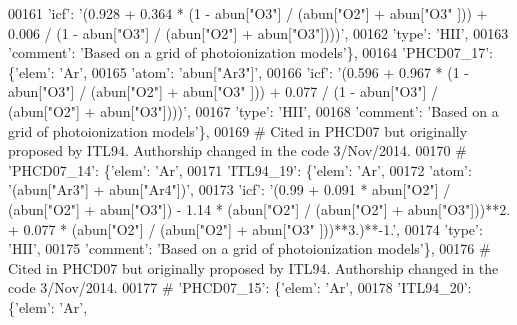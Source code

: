 \begin{DoxyCode}
00161                                        \textcolor{stringliteral}{'icf'}: \textcolor{stringliteral}{'(0.928 + 0.364 * (1 - abun["O3"] / (abun["O2"] + abun["O3"
      ])) + 0.006 / (1 - abun["O3"] / (abun["O2"] + abun["O3"])))'},
00162                                        \textcolor{stringliteral}{'type'}: \textcolor{stringliteral}{'HII'},
00163                                        \textcolor{stringliteral}{'comment'}: \textcolor{stringliteral}{'Based on a grid of photoionization models'}\},
00164                          \textcolor{stringliteral}{'PHCD07\_17'}: \{\textcolor{stringliteral}{'elem'}: \textcolor{stringliteral}{'Ar'},
00165                                        \textcolor{stringliteral}{'atom'}: \textcolor{stringliteral}{'abun["Ar3"]'},
00166                                        \textcolor{stringliteral}{'icf'}: \textcolor{stringliteral}{'(0.596 + 0.967 * (1 - abun["O3"] / (abun["O2"] + abun["O3"
      ])) + 0.077 / (1 - abun["O3"] / (abun["O2"] + abun["O3"])))'},
00167                                        \textcolor{stringliteral}{'type'}: \textcolor{stringliteral}{'HII'},
00168                                        \textcolor{stringliteral}{'comment'}: \textcolor{stringliteral}{'Based on a grid of photoionization models'}\},
00169 \textcolor{comment}{# Cited in PHCD07 but originally proposed by ITL94. Authorship changed in the code 3/Nov/2014. }
00170 \textcolor{comment}{#                         'PHCD07\_14': \{'elem': 'Ar',}
00171                          \textcolor{stringliteral}{'ITL94\_19'}: \{\textcolor{stringliteral}{'elem'}: \textcolor{stringliteral}{'Ar'},
00172                                        \textcolor{stringliteral}{'atom'}: \textcolor{stringliteral}{'(abun["Ar3"] + abun["Ar4"])'},
00173                                        \textcolor{stringliteral}{'icf'}: \textcolor{stringliteral}{'(0.99 + 0.091 * abun["O2"] / (abun["O2"] + abun["O3"]) -
       1.14 * (abun["O2"] / (abun["O2"] + abun["O3"]))**2. + 0.077 * (abun["O2"] / (abun["O2"] + abun["O3"
      ]))**3.)**-1.'},
00174                                        \textcolor{stringliteral}{'type'}: \textcolor{stringliteral}{'HII'},
00175                                        \textcolor{stringliteral}{'comment'}: \textcolor{stringliteral}{'Based on a grid of photoionization models'}\},
00176 \textcolor{comment}{# Cited in PHCD07 but originally proposed by ITL94. Authorship changed in the code 3/Nov/2014. }
00177 \textcolor{comment}{#                         'PHCD07\_15': \{'elem': 'Ar',}
00178                          \textcolor{stringliteral}{'ITL94\_20'}: \{\textcolor{stringliteral}{'elem'}: \textcolor{stringliteral}{'Ar'},

\end{DoxyCode}
